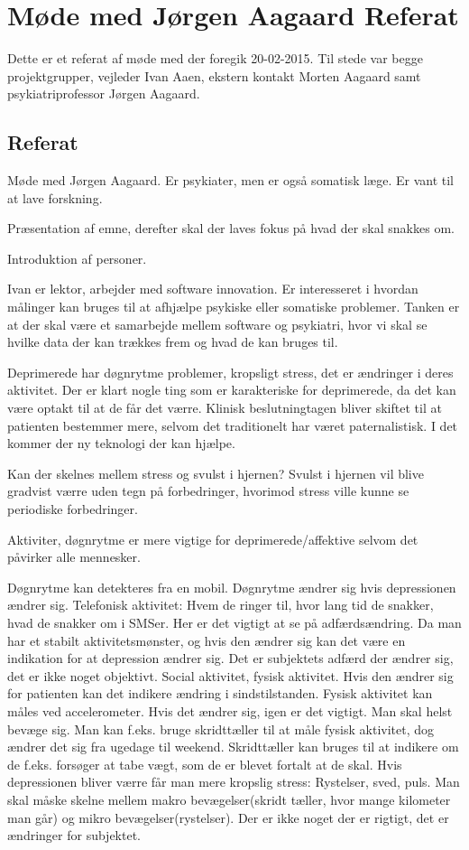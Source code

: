 \chapter{Møde med Jørgen Aagaard Referat}\label{app:moede-med-joergen-referat}

Dette er et referat af møde med \citet{misc:jorgen-aagaard} der foregik 20-02-2015. Til stede var begge projektgrupper, vejleder Ivan Aaen, ekstern kontakt Morten Aagaard samt psykiatriprofessor Jørgen Aagaard.

\section{Referat}
Møde med Jørgen Aagaard. Er psykiater, men er også somatisk læge. Er vant til at lave forskning.

Præsentation af emne, derefter skal der laves fokus på hvad der skal snakkes om.

Introduktion af personer.

Ivan er lektor, arbejder med software innovation. Er interesseret i hvordan målinger kan bruges til at afhjælpe psykiske eller somatiske problemer. Tanken er at der skal være et samarbejde mellem software og psykiatri, hvor vi skal se hvilke data der kan trækkes frem og hvad de kan bruges til.

Deprimerede har døgnrytme problemer, kropsligt stress, det er ændringer i deres aktivitet. Der er klart nogle ting som er karakteriske for deprimerede, da det kan være optakt til at de får det værre. Klinisk beslutningtagen bliver skiftet til at patienten bestemmer mere, selvom det traditionelt har været paternalistisk. I det kommer der ny teknologi der kan hjælpe.

Kan der skelnes mellem stress og svulst i hjernen?
Svulst i hjernen vil blive gradvist værre uden tegn på forbedringer, hvorimod stress ville kunne se periodiske forbedringer.

Aktiviter, døgnrytme er mere vigtige for deprimerede/affektive selvom det påvirker alle mennesker. 

Døgnrytme kan detekteres fra en mobil. Døgnrytme ændrer sig hvis depressionen ændrer sig. 
Telefonisk aktivitet: Hvem de ringer til, hvor lang tid de snakker, hvad de snakker om i SMSer. Her er det vigtigt at se på adfærdsændring. Da man har et stabilt aktivitetsmønster, og hvis den ændrer sig kan det være en indikation for at depression ændrer sig. Det er subjektets adfærd der ændrer sig, det er ikke noget objektivt. 
Social aktivitet, fysisk aktivitet. Hvis den ændrer sig for patienten kan det indikere ændring i sindstilstanden. 
Fysisk aktivitet kan måles ved accelerometer. Hvis det ændrer sig, igen er det vigtigt. Man skal helst bevæge sig. Man kan f.eks. bruge skridttæller til at måle fysisk aktivitet, dog ændrer det sig fra ugedage til weekend. Skridttæller kan bruges til at indikere om de f.eks. forsøger at tabe vægt, som de er blevet fortalt at de skal. Hvis depressionen bliver værre får man mere kropslig stress: Rystelser, sved, puls. Man skal måske skelne mellem makro bevægelser(skridt tæller, hvor mange kilometer man går) og mikro bevægelser(rystelser). Der er ikke noget der er rigtigt, det er ændringer for subjektet.

